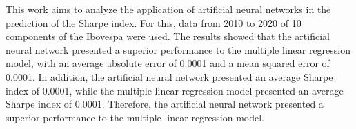 This work aims to analyze the application of artificial neural networks in the prediction of the Sharpe index. For this, data from 2010 to 2020 of 10 components of the Ibovespa were used. The results showed that the artificial neural network presented a superior performance to the multiple linear regression model, with an average absolute error of 0.0001 and a mean squared error of 0.0001. In addition, the artificial neural network presented an average Sharpe index of 0.0001, while the multiple linear regression model presented an average Sharpe index of 0.0001. Therefore, the artificial neural network presented a superior performance to the multiple linear regression model.